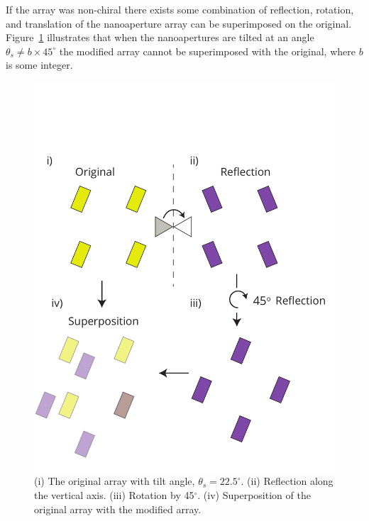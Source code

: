 If the array was non-chiral there exists some combination of reflection, rotation, and translation of the nanoaperture array can be superimposed on the original. Figure~\ref{fig:chiral} illustrates that when the nanoapertures are tilted at an angle $\theta_s \neq b\times 45^\circ$ the modified array cannot be superimposed with the original, where $b$ is some integer.
\begin{figure}[th!]
\centering
\includegraphics[width=0.9\linewidth]{chirality_proof.pdf}
\caption{(i) The original array with tilt angle, $\theta_s = 22.5^\circ$. (ii) Reflection along the vertical axis. (iii) Rotation by 45$^\circ$. (iv) Superposition of the original array with the modified array.}
\label{fig:chiral}
\end{figure}
